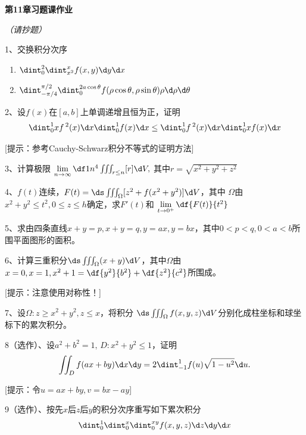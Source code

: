 \newpage

{\Large\bf 第11章习题课作业}

{\it （请抄题）}

1、交换积分次序
 \begin{enumerate}[(1)]
    \setlength{\itemindent}{1cm}
    \item $\dint_0^2\dint_{x^2}^xf(x,y)\d y\d x$
    \item $\dint_{-\pi/4}^{\pi/2}\dint_0^{2a\cos\theta}
    f(\rho\cos\theta,\rho\sin\theta)\rho\d\rho\d\theta$
 \end{enumerate}
 
2、设$f(x)$在$[a,b]$上单调递增且恒为正，证明
	$${\dint_0^1xf\,^2(x)\d x}{\dint_0^1f(x)\d x}\leq
	{\dint_0^1f\,^2(x)\d x}{\dint_0^1xf(x)\d x}$$

[提示：参考Cauchy-Schwarz积分不等式的证明方法]
	
3、计算极限
	$\lim\limits_{n\to\infty}\df 1{n^4}\iiint_{r\leq n}[r]\d V,$
	其中$r=\sqrt{x^2+y^2+z^2}$
	
4、$f(t)$连续，$F(t)=\ds\iiint_{\Omega}[z^2+f(x^2+y^2)]\d V$，其中
	$\Omega$由$x^2+y^2\leq t^2,0\leq z\leq h$确定，求$F'(t)$和
	$\lim\limits_{t\to 0^+}\df{F(t)}{t^2}$

5、求由四条直线$x+y=p,x+y=q,y=ax,y=bx$，其中$0<p<q,0<a<b$所围平面图形的面积。

6、计算三重积分$\ds\iiint_{\Omega}(x+y)\d V$，其中$\Omega$由
$x=0,x=1,x^2+1=\df{y^2}{b^2}+\df{z^2}{c^2}$所围成。

[提示：注意使用对称性！]

7、设$\Omega:z\geq x^2+y^2,z\leq x$，将积分
$\ds\iiint_{\Omega}f(x,y,z)\d V$分别化成柱坐标和球坐标下的累次积分。

% 

8（选作）、设$a^2+b^2=1,\, D:x^2+y^2\leq 1$，证明
$$\iint_Df(ax+by)\d x\d y=2\dint_{-1}^1f(u)\sqrt{1-u^2}\d u.$$

[提示：令$u=ax+by,v=bx-ay$]

9（选作）、按先$x$后$z$后$y$的积分次序重写如下累次积分
$$\dint_0^1\dint_0^x\dint_0^{xy}f(x,y,z)\d z\d y\d x$$

